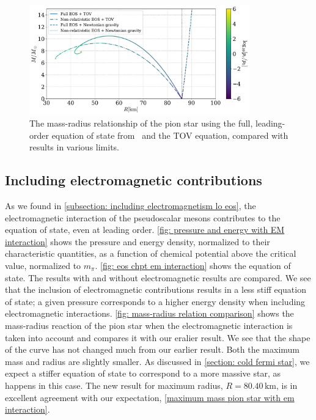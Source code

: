 \begin{figure}[H]
    \centering
    \includegraphics[width=0.85\textwidth]{../scripts/figurer/pion_star/mass_radius_comparison.pdf}
    \caption{
        The mass-radius relationship of the pion star using the full, leading-order equation of state from \chpt\, and the TOV equation, compared with results in various limits.
        }
        \label{fig: mass-radius relation pion star comparison}
\end{figure}




\subsection{Including electromagnetic contributions}

As we found in \autoref{subsection: including electromagnetism lo eos}, the electromagnetic interaction of the pseudoscalar mesons contributes to the equation of state, even at leading order.
\autoref{fig: pressure and energy with EM interaction} shows the pressure and energy density, normalized to their characteristic quantities, as a function of chemical potential above the critical value, normalized to $m_\pi$.
\autoref{fig: eos chpt em interaction} shows the equation of state.
The results with and without electromagnetic results are compared.
We see that the inclusion of electromagnetic contributions results in a less stiff equation of state; a given pressure corresponds to a higher energy density when including electromagnetic interactions.
\autoref{fig: mass-radius relation comparison} shows the mass-radius reaction of the pion star when the electromagnetic interaction is taken into account and compares it with our eralier result.
We see that the shape of the curve has not changed much from our earlier result. 
Both the maximum mass and radius are slightly smaller.
As discussed in \autoref{section: cold fermi star}, we expect a stiffer equation of state to correspond to a more massive star, as happens in this case.
The new result for maximum radius, $R = 80.40 \, \text{km}$, is in excellent agreement with our expectation, \autoref{maximum mass pion star with em interaction}.


